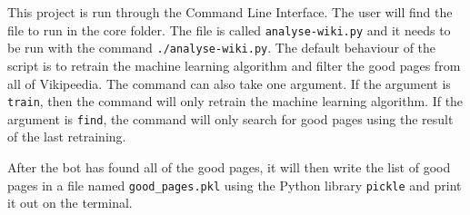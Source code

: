 This project is run through the Command Line Interface. The user will find the
file to run in the core folder. The file is called \verb;analyse-wiki.py; and it
needs to be run with the command \verb;./analyse-wiki.py;. The default behaviour
of the script is to retrain the machine learning algorithm and filter the good
pages from all of Vikipeedia. The command can also take one argument. If the
argument is \verb;train;, then the command will only retrain the machine
learning algorithm. If the argument is \verb;find;, the command will only search
for good pages using the result of the last retraining. 


After the bot has found all of the good pages, it will then write the list of
good pages in a file named \verb;good_pages.pkl; using the Python library
\verb;pickle; and print it out on the terminal.